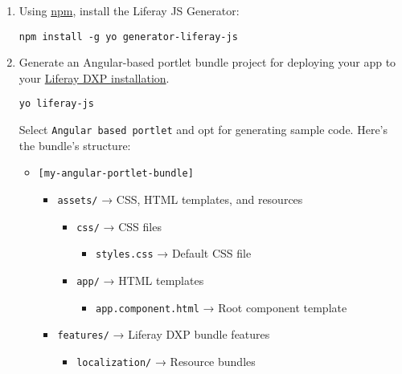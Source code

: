 \begin{enumerate}
\def\labelenumi{\arabic{enumi}.}
\item
  Using \href{https://www.npmjs.com}{npm}, install the Liferay JS
  Generator:

\begin{verbatim}
npm install -g yo generator-liferay-js
\end{verbatim}
\item
  Generate an Angular-based portlet bundle project for deploying your
  app to your \href{/deployment/docs/installing-product}{Liferay DXP
  installation}.

\begin{verbatim}
yo liferay-js
\end{verbatim}

  Select \texttt{Angular\ based\ portlet} and opt for generating sample
  code. Here's the bundle's structure:

  \begin{itemize}
  \tightlist
  \item
    \texttt{{[}my-angular-portlet-bundle{]}}

    \begin{itemize}
    \tightlist
    \item
      \texttt{assets/} → CSS, HTML templates, and resources

      \begin{itemize}
      \tightlist
      \item
        \texttt{css/} → CSS files

        \begin{itemize}
        \tightlist
        \item
          \texttt{styles.css} → Default CSS file
        \end{itemize}
      \item
        \texttt{app/} → HTML templates

        \begin{itemize}
        \tightlist
        \item
          \texttt{app.component.html} → Root component template
        \end{itemize}
      \end{itemize}
    \item
      \texttt{features/} → Liferay DXP bundle features

      \begin{itemize}
      \tightlist
      \item
        \texttt{localization/} → Resource bundles


\end{itemize}
\end{itemize}
\end{itemize}
\end{enumerate}
